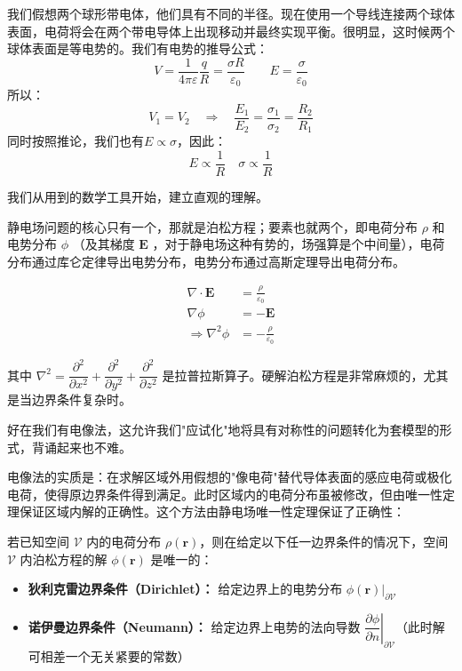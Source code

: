 \begin{prove}[导体表面电场与曲率半径的关系]
    我们假想两个球形带电体，他们具有不同的半径。现在使用一个导线连接两个球体表面，电荷将会在两个带电导体上出现移动并最终实现平衡。很明显，这时候两个球体表面是等电势的。我们有电势的推导公式：
    \[V=\dfrac{1}{4\pi\varepsilon}\dfrac{q}{R}=\dfrac{\sigma R}{\varepsilon_0}\qquad E=\dfrac{\sigma}{\varepsilon_0}\]
    所以：
    \[V_1 =V_2\quad\Rightarrow\quad \dfrac{E_1}{E_2}=\dfrac{\sigma_1}{\sigma_2}=\dfrac{R_2}{R_1}\]
    同时按照推论，我们也有$E\propto\sigma$，因此：
    \[E\propto\dfrac{1}{R}\quad\sigma\propto\dfrac{1}{R}\]
\end{prove}

\begin{prove}
    我们从用到的数学工具开始，建立直观的理解。
    
    静电场问题的核心只有一个，那就是泊松方程；要素也就两个，即电荷分布 $\rho$ 和电势分布 $\phi$ （及其梯度 $\mathbf{E}$ ，对于静电场这种有势的，场强算是个中间量），电荷分布通过库仑定律导出电势分布，电势分布通过高斯定理导出电荷分布。

    \begin{law}
        \begin{align}
            \nabla \cdot \mathbf{E} &= \frac{\rho}{\varepsilon_0} \\
            \nabla \phi &= -\mathbf{E} \\
            \Rightarrow \nabla^2 \phi &= -\frac{\rho}{\varepsilon_0}
        \end{align}
    \end{law}

    其中 $\nabla^2=\dfrac{\partial^2}{\partial x^2}+\dfrac{\partial^2}{\partial y^2}+\dfrac{\partial^2}{\partial z^2}$ 是拉普拉斯算子。硬解泊松方程是非常麻烦的，尤其是当边界条件复杂时。

    好在我们有电像法，这允许我们"应试化"地将具有对称性的问题转化为套模型的形式，背诵起来也不难。
    
    电像法的实质是：在求解区域外用假想的"像电荷"替代导体表面的感应电荷或极化电荷，使得原边界条件得到满足。此时区域内的电荷分布虽被修改，但由唯一性定理保证区域内解的正确性。这个方法由静电场唯一性定理保证了正确性：

    \begin{law}
        若已知空间 $\mathcal{V}$ 内的电荷分布 $\rho(\mathbf{r})$，则在给定以下任一边界条件的情况下，空间 $\mathcal{V}$ 内泊松方程的解 $\phi(\mathbf{r})$ 是唯一的：
        \begin{itemize}
            \item \textbf{狄利克雷边界条件（Dirichlet）：} 给定边界上的电势分布 $\phi(\mathbf{r})|_{\partial \mathcal{V}}$
            \item \textbf{诺伊曼边界条件（Neumann）：} 给定边界上电势的法向导数 $\left.\dfrac{\partial \phi}{\partial n}\right|_{\partial \mathcal{V}}$（此时解可相差一个无关紧要的常数）
        \end{itemize}
    \end{law}


\end{prove}
